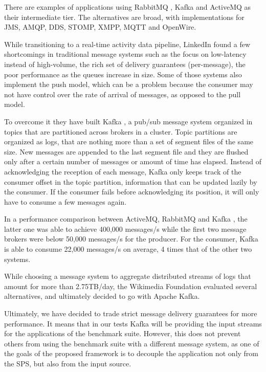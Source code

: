\documentclass[ppgc,diss,english]{iiufrgs}
\begin{document}
There are examples of applications using RabbitMQ \cite{yang2013big, bumgardner2014scalable}, Kafka \cite{chardonnens2013big, lim2013execution, wang2013cluster} and ActiveMQ \cite{appel2012eventlets, krawczyk2011basic} as their intermediate tier. The alternatives are broad, with implementations for JMS, AMQP, DDS, STOMP, XMPP, MQTT and OpenWire.

While transitioning to a real-time activity data pipeline, LinkedIn \cite{goodhope2012building} found a few shortcomings in traditional message systems such as the focus on low-latency instead of high-volume, the rich set of delivery guarantees (per-message), the poor performance as the queues increase in size. Some of those systems also implement the push model, which can be a problem because the consumer may not have control over the rate of arrival of messages, as opposed to the pull model.

To overcome it they have built Kafka \cite{kreps2011kafka}, a pub/sub message system organized in topics that are partitioned across brokers in a cluster. Topic partitions are organized as logs, that are nothing more than a set of segment files of the same size. New messages are appended to the last segment file and they are flushed only after a certain number of messages or amount of time has elapsed. Instead of acknowledging the reception of each message, Kafka only keeps track of the consumer offset in the topic partition, information that can be updated lazily by the consumer. If the consumer fails before acknowledging its position, it will only have to consume a few messages again.

In a performance comparison between ActiveMQ, RabbitMQ and Kafka \cite{kreps2011kafka}, the latter one was able to achieve 400,000 messages/s while the first two message brokers were below 50,000 messages/s for the producer. For the consumer, Kafka is able to consume 22,000 messages/s on average, 4 times that of the other two systems.

While choosing a message system to aggregate distributed streams of logs that amount for more than 2.75TB/day, the Wikimedia Foundation evaluated \cite{Wikimedia:2014} several alternatives, and ultimately decided to go with Apache Kafka.

Ultimately, we have decided to trade strict message delivery guarantees for more performance. It means that in our tests Kafka will be providing the input streams for the applications of the benchmark suite. However, this does not prevent others from using the benchmark suite with a different message system, as one of the goals of the proposed framework is to decouple the application not only from the SPS, but also from the input source.
\end{document}
